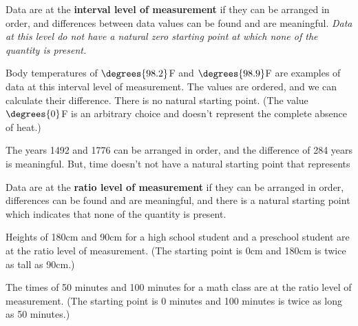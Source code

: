 \documentclass{beamer}
\begin{document}
\begin{frame}
\begin{definition}
Data are at the \textbf{interval level of measurement} if they can be arranged in order, and differences between data values can be found and are meaningful. \emph{Data at this level do not have a natural zero starting point at which none of the quantity is present.}
\end{definition}\pause

\begin{example}
Body temperatures of $\degrees{98.2}$F and $\degrees{98.9}$F are examples of data at this interval level of measurement. The values are ordered, and we can calculate their difference. There is no natural starting point. (The value $\degrees{0}$F is an arbitrary choice and doesn't represent the complete absence of heat.)
\end{example}\pause

\begin{example}
The years 1492 and 1776 can be arranged in order, and the difference of 284 years is meaningful. But, time doesn't not have a natural starting point that represents 
\end{example}
\end{frame}

\begin{frame}
\begin{definition}
Data are at the \textbf{ratio level of measurement} if they can be arranged in order, differences can be found and are meaningful, and there is a natural starting point which indicates that none of the quantity is present. 
\end{definition}\pause

\begin{example}
Heights of 180cm and 90cm for a high school student and a preschool student are at the ratio level of measurement. (The starting point is 0cm and 180cm is twice as tall as 90cm.)
\end{example}\pause

\begin{example}
The times of 50 minutes and 100 minutes for a math class are at the ratio level of measurement. (The starting point is 0 minutes and 100 minutes is twice as long as 50 minutes.)
\end{example}
\end{frame}
\end{document}
